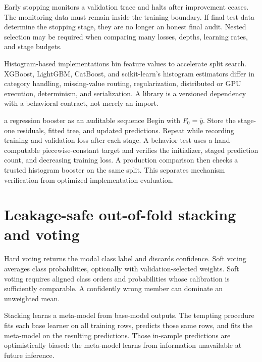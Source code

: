 Early stopping monitors a validation trace and halts after improvement ceases.
The monitoring data must remain inside the training boundary. If final test
data determine the stopping stage, they are no longer an honest final audit.
Nested selection may be required when comparing many losses, depths, learning
rates, and stage budgets.

Histogram-based implementations bin feature values to accelerate split search.
XGBoost, LightGBM, CatBoost, and scikit-learn's histogram estimators differ in
category handling, missing-value routing, regularization, distributed or GPU
execution, determinism, and serialization. A library is a versioned dependency
with a behavioral contract, not merely an import.

\begin{workedexample}{a regression booster as an auditable sequence}
Begin with $F_0=\overline y$. Store the stage-one residuals, fitted tree, and
updated predictions. Repeat while recording training and validation loss after
each stage. A behavior test uses a hand-computable piecewise-constant target and
verifies the initializer, staged prediction count, and decreasing training
loss. A production comparison then checks a trusted histogram booster on the
same split. This separates mechanism verification from optimized implementation
evaluation.
\end{workedexample}


\section{Leakage-safe out-of-fold stacking and voting}

Hard voting returns the modal class label and discards confidence. Soft voting
averages class probabilities, optionally with validation-selected weights.
Soft voting requires aligned class orders and probabilities whose calibration
is sufficiently comparable. A confidently wrong member can dominate an
unweighted mean.

Stacking learns a meta-model from base-model outputs. The tempting procedure
fits each base learner on all training rows, predicts those same rows, and fits
the meta-model on the resulting predictions. Those in-sample predictions are
optimistically biased: the meta-model learns from information unavailable at
future inference.

